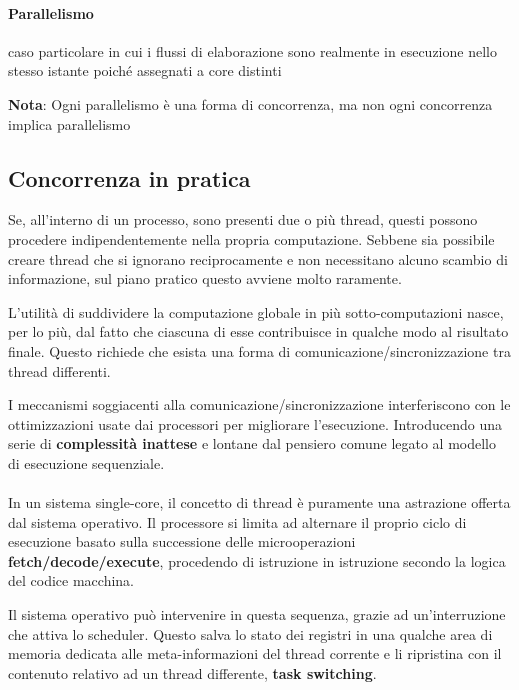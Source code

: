 \paragraph{Parallelismo} caso particolare in cui i flussi di elaborazione sono
realmente in esecuzione nello stesso istante poiché assegnati a core distinti

\begin{tcolorbox}
  \textbf{Nota}:  Ogni parallelismo è una forma di concorrenza, ma non ogni
  concorrenza implica parallelismo
\end{tcolorbox}

\subsection{Concorrenza in pratica}

Se, all'interno di un processo, sono presenti due o più thread, questi possono
procedere indipendentemente nella propria computazione. Sebbene sia possibile
creare thread che si ignorano reciprocamente e non necessitano alcuno scambio di
informazione, sul piano pratico questo avviene molto raramente.

L'utilità di
suddividere la computazione globale in più sotto-computazioni nasce, per lo più,
dal fatto che ciascuna di esse contribuisce in qualche modo al risultato finale. Questo richiede che esista una forma di comunicazione/sincronizzazione tra
thread differenti.

I meccanismi soggiacenti alla comunicazione/sincronizzazione
interferiscono con le ottimizzazioni usate dai processori per migliorare
l'esecuzione. Introducendo una serie di \textbf{complessità inattese} e lontane dal
pensiero comune legato al modello di esecuzione sequenziale.

\paragraph{}

In un sistema single-core, il concetto di thread è puramente una astrazione
offerta dal sistema operativo. Il processore si limita ad alternare il proprio
ciclo di esecuzione basato sulla successione delle microoperazioni
\textbf{fetch/decode/execute}, procedendo di istruzione in istruzione secondo la logica
del codice macchina.

Il sistema operativo può intervenire in questa sequenza, grazie ad
un'interruzione che attiva lo scheduler. Questo salva lo stato dei registri in
una qualche area di memoria dedicata alle meta-informazioni del thread corrente
e li ripristina con il contenuto relativo ad un thread differente, \textbf{task
  switching}.



